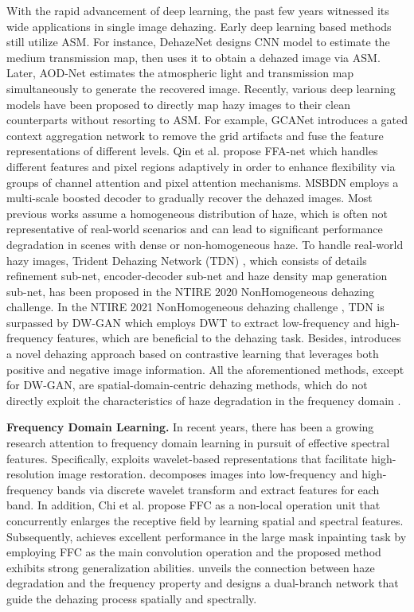 \documentclass[10pt,twocolumn,letterpaper]{article}
\begin{document}
With the rapid advancement of deep learning, the past few years witnessed its wide applications in single image dehazing. Early deep learning based methods still utilize ASM. For instance, DehazeNet \cite{14} designs CNN model to estimate the medium transmission map, then uses it to obtain a dehazed image via ASM. Later, AOD-Net \cite{28} estimates the atmospheric light and transmission map simultaneously to generate the recovered image. Recently, various deep learning models have been proposed to directly map hazy images to their clean counterparts without resorting to ASM. For example, GCANet \cite{dehazing-deraining} introduces a gated context aggregation network to remove the grid artifacts and fuse the feature representations of different levels. Qin et al.\cite{36} propose FFA-net which handles different features and pixel regions adaptively in order to enhance flexibility via groups of channel attention and pixel attention mechanisms. MSBDN \cite{fusion} employs a multi-scale boosted decoder to gradually recover the dehazed images. Most previous works assume a homogeneous distribution of haze, which is often not representative of real-world scenarios and can lead to significant performance degradation in scenes with dense or non-homogeneous haze. To handle real-world hazy images, Trident Dehazing Network (TDN) \cite{ntire2020}, which consists of details refinement sub-net, encoder-decoder sub-net and haze density map generation sub-net, has been proposed in the NTIRE 2020 NonHomogeneous dehazing challenge. In the NTIRE 2021 NonHomogeneous dehazing challenge \cite{ntire2021}, TDN is surpassed by DW-GAN \cite{DW-GAN} which employs DWT to extract low-frequency and high-frequency features, which are beneficial to the dehazing task. Besides, \cite{contrast2022} introduces a novel dehazing approach based on contrastive learning that leverages both positive and negative image information. All the aforementioned methods, except for DW-GAN, are spatial-domain-centric dehazing methods, which do not directly exploit the characteristics of haze degradation in the frequency domain \cite{frequencydehazing2022}.%

\textbf{Frequency Domain Learning.} In recent years, there has been a growing research attention to frequency domain learning in pursuit of effective spectral features. Specifically, \cite{wavelete-domain} exploits wavelet-based representations that facilitate high-resolution image restoration. \cite{wavelete-gan} decomposes images into low-frequency and high-frequency bands via discrete wavelet transform and extract features for each band. In addition, Chi et al. \cite{FFC} propose FFC as a non-local operation unit that concurrently enlarges the receptive field by learning spatial and spectral features. Subsequently, \cite{lama} achieves excellent performance in the large mask inpainting task by employing FFC as the main convolution operation and the proposed method exhibits strong generalization abilities. \cite{frequencydehazing2022} unveils the connection between haze degradation and the frequency property and designs a dual-branch network that guide the dehazing process spatially and spectrally. 
\end{document}
